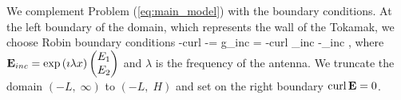 We complement Problem (\ref{eq:main_model}) with the boundary conditions.
At the left boundary of the domain, which represents the wall of the Tokamak, we choose Robin boundary conditions 
\be
-curl \E -\imath \lambda\E \wedge \n = g_{inc} = -curl \E_{inc} -\imath\lambda\E_{inc} \wedge \n,
\ee
where ${\bf E}_{inc} = \exp \left(\imath \lambda x\right)\begin{pmatrix} E_1\\ E_2 \end{pmatrix}$ and $\lambda$ is 
the frequency of the antenna.
We truncate the domain 
$(-L,\; \infty)$ to $(-L,\; H)$ and set on the right boundary $\operatorname{curl} {\bf E} = 0$. 

